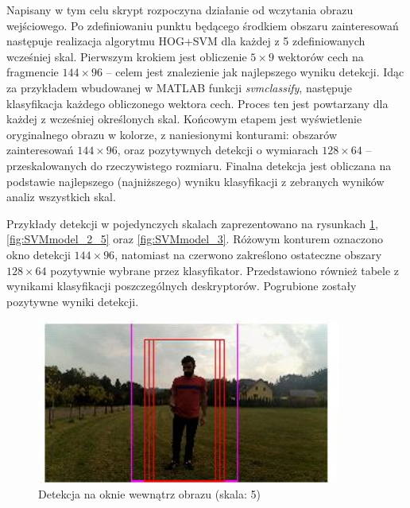 Napisany w tym celu skrypt rozpoczyna działanie od wczytania obrazu wejściowego. 
Po zdefiniowaniu punktu będącego środkiem obszaru zainteresowań następuje realizacja algorytmu HOG+SVM dla każdej z 5 zdefiniowanych wcześniej skal.
Pierwszym krokiem jest obliczenie $5\times 9$ wektorów cech na fragmencie $144 \times 96$ -- celem jest znalezienie jak najlepszego wyniku detekcji.  %
Idąc za przykładem wbudowanej w MATLAB funkcji \textit{svmclassify}, następuje klasyfikacja każdego obliczonego wektora cech. Proces ten jest powtarzany dla każdej z wcześniej określonych skal. 
Końcowym etapem jest wyświetlenie oryginalnego obrazu w kolorze, z naniesionymi konturami: obszarów zainteresowań $144\times 96$, oraz pozytywnych detekcji o wymiarach $128\times 64$ -- przeskalowanych do rzeczywistego rozmiaru. Finalna detekcja jest obliczana na podstawie najlepszego (najniższego) wyniku klasyfikacji z zebranych wyników analiz wszystkich skal.

Przykłady detekcji w pojedynczych skalach zaprezentowano na rysunkach \ref{fig:SVMmodel}, \ref{fig:SVMmodel_2_5} oraz \ref{fig:SVMmodel_3}.
Różowym konturem oznaczono okno detekcji $144 \times 96$, natomiast na czerwono zakreślono ostateczne obszary $128\times 64$ pozytywnie wybrane przez klasyfikator. Przedstawiono również tabele z wynikami klasyfikacji poszczególnych deskryptorów. Pogrubione zostały pozytywne wyniki detekcji.%
\begin{figure}[]
	\centering
	\includegraphics[width=10cm]{3_SVM_model.jpg}
	\caption{Detekcja na oknie wewnątrz obrazu (skala: 5)}
	\label{fig:SVMmodel}
\end{figure}

